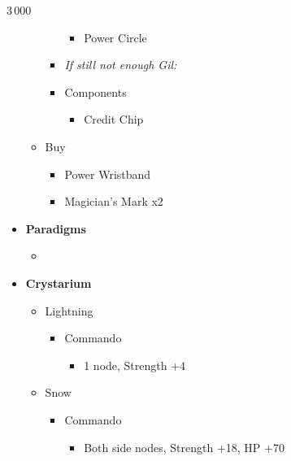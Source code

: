 \begin{multicols}{2}
\begin{shop}{3\,000}
\begin{itemize}
\begin{itemize}
\begin{itemize}
					                  \begin{itemize}
						                  \item Power Circle
					                  \end{itemize}
					            \item \textit{If still not enough Gil:}
					            \item Components
					                  \begin{itemize}
						                  \item Credit Chip
					                  \end{itemize}
				            \end{itemize}
				      \item Buy
				            \begin{itemize}
					            \item Power Wristband
					            \item Magician's Mark x2
				            \end{itemize}
			      \end{itemize}
		\end{itemize}
	\end{shop}
	\begin{menu}
		\begin{itemize}
			\item \textbf{Paradigms}
			      \begin{itemize}
				      \item {}%
				            {\paradigmline{(\rav)}{\rav}{\rav}}%
				            {\paradigmline{\com}{\sen}{\med}}%
				            {\paradigmline[3]{\textit{[\com]}}{\textit{\com}}{\textit{\rav}}}%
				            {\paradigmline{[\com]}{\com}{\rav}}
			      \end{itemize}
			\item \textbf{Crystarium}
			      \begin{itemize}
				      \item Lightning
				            \begin{itemize}
					            \item Commando
					                  \begin{itemize}
						                  \item 1 node, Strength +4
					                  \end{itemize}
				            \end{itemize}
				      \item Snow
				            \begin{itemize}
					            \item Commando
					                  \begin{itemize}
						                  \item Both side nodes, Strength +18, HP +70
					                  \end{itemize}
				            \end{itemize}
			      \end{itemize}


\end{itemize}
\end{menu}
\end{multicols}
